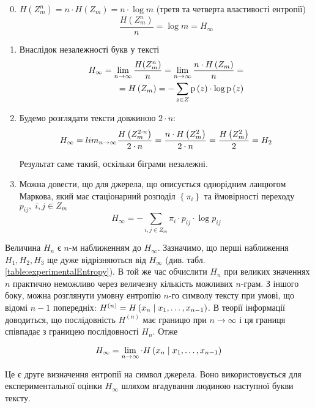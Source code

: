 \begin{enumerate}[label=\bfseries M\arabic*:]
    \setcounter{enumi}{-1}
    \item $H(Z_{m}^{n})=n\cdot H(Z_{m})=n\cdot \log{m}$
        (третя та четверта властивості ентропії)
        $$\frac{H(Z_{m}^{n})}{n}=\log{m}=H_{\infty}$$
    \item Внаслідок незалежності букв у тексті
        \begin{align*}
            H_\infty
                = \lim_{n\to\infty}\frac{H(Z_{m}^{n})}{n}
                = \lim_{n\to\infty}\frac{n \cdot H\left( Z_{m} \right)}{n} = \\
                = H\left( Z_{m} \right)
                = - \sum_{z \in Z} \mathrm{p}\left(z\right)\cdot \log{\mathrm{p}\left(z\right)}
        \end{align*}
    \item Будемо розглядати тексти довжиною $2 \cdot n$:
        $$H_\infty
            = lim_{n\to\infty}\frac{H\left( Z_{m}^{2 \cdot n} \right)}{2 \cdot n}
            =\frac{n \cdot H\left( Z_{m}^{2} \right)}{2 \cdot n}
            =\frac{H\left( Z_{m}^{2} \right)}{2}
            =H_2$$

        Результат саме такий, оскільки біграми незалежні.
    \item Можна довести, що для джерела, що описується однорідним ланцюгом
        Маркова, який має стаціонарний розподіл  $\left\{ \pi_{i} \right\}$
        та ймовірності переходу $p_{ij},\; i,j \in Z_{m}$
        $$H_\infty
            = - \sum_{i,j\in Z_m} \pi_{i} \cdot p_{ij} \cdot \log{p_{ij}}$$
\end{enumerate}

Величина  $H_n$ є  $n$-м наближенням до  $H_\infty$. Зазначимо,
що перші наближення  $H_1,H_2,H_3$ ще дуже відрізняються від 
$H_\infty$ (див. табл. \ref{table:experimentalEntropy}). В той же час обчислити
$H_n$ при великих значеннях  $n$ практично неможливо  через величезну кількість
можливих $n$-грам. З іншого боку, можна розглянути умовну ентропію 
$n$-го символу тексту при умові, що відомі  $n-1$ попередніх: 
$H^{\left( n \right)} = H\left( x_n \;\middle|\; x_1,\dots,x_{n-1} \right)$. В теорії
інформації доводиться, що послідовність  $H^{(n)}$ має границю при 
$n\rightarrow \infty$ і ця границя співпадає з границею послідовності $H_n$.
Отже

$$H_\infty
    = \lim_{n\rightarrow \infty} \cdot H\left( x_n \;\middle|\; x_1,\dots,x_{n-1} \right)$$

Це є друге визначення ентропії на символ джерела. Воно використовується для
експериментальної оцінки  $H_\infty$ шляхом вгадування людиною наступної
букви тексту.

